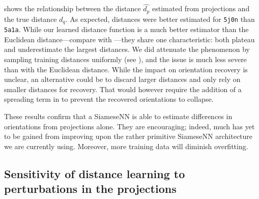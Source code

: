 
 shows the relationship between the distance $\widehat{d_p}$ estimated from projections and the true distance $d_q$.
As expected, distances were better estimated for \texttt{5j0n} than \texttt{5a1a}.
While our learned distance function is a much better estimator than the Euclidean distance---compare  with ---they share one characteristic: both plateau and underestimate the largest distances.
We did attenuate the phenomenon by sampling training distances uniformly (see ), and the issue is much less severe than with the Euclidean distance.
While the impact on orientation recovery is unclear, an alternative could be to discard larger distances and only rely on smaller distances for recovery.
That would however require the addition of a spreading term in  to prevent the recovered orientations to collapse.

These results confirm that a SiameseNN is able to estimate differences in orientations from projections alone.
They are encouraging; indeed, much has yet to be gained from improving upon the rather primitive SiameseNN architecture we are currently using.
Moreover, more training data will diminish overfitting.


\subsection{Sensitivity of distance learning to perturbations in the projections}\label{sec:results:distance-estimation:sensitivity}

